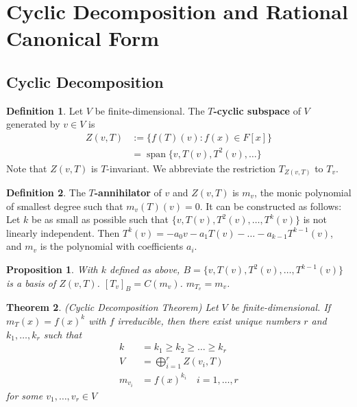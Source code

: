 \documentclass[12pt]{article}
\newtheorem{thm}{Theorem}[section]
\newtheorem{prop}[thm]{Proposition}
\theoremstyle{definition}
\newtheorem*{defn*}{Definition}
\DeclareMathOperator{\spn}{span}
\begin{document}
%

\section{Cyclic Decomposition and Rational Canonical Form}

\subsection{Cyclic Decomposition}

\begin{defn*}
	Let $V$ be finite-dimensional.
	The \textbf{$T$-cyclic subspace} of $V$ generated by $v \in V$ is
	\begin{align*}
		Z(v, T) &:= \{f(T)(v) : f(x) \in F[x]\}\\ 
				&= \spn\{v, T(v), T^2(v), \ldots\}
	\end{align*}
	Note that $Z(v, T)$ is $T$-invariant.
	We abbreviate the restriction $T_{Z(v, T)}$ to $T_v$.
\end{defn*}

\begin{defn*}
	The \textbf{$T$-annihilator} of $v$ and $Z(v, T)$ is $m_v$, the monic polynomial of smallest degree such that $m_v(T)(v) = 0$.
	It can be constructed as follows:
	Let $k$ be as small as possible such that $\{v, T(v), T^2(v), \ldots, T^k(v)\}$ is not linearly independent.
	Then $T^k(v) = -a_0v - a_1T(v) - \ldots - a_{k - 1}T^{k - 1}(v)$, and $m_v$ is the polynomial with coefficients $a_i$.
\end{defn*}

\begin{prop}
	With $k$ defined as above, $B = \{v, T(v), T^2(v), \ldots, T^{k - 1}(v)\}$ is a basis of $Z(v, T)$. $[T_v]_B = C(m_v)$. $m_{T_v} = m_v$.
\end{prop}

\begin{thm}
	(Cyclic Decomposition Theorem)
	Let $V$ be finite-dimensional.
	If $m_T(x) = f(x)^k$ with $f$ irreducible, then there exist unique numbers $r$ and $k_1, \ldots, k_r$ such that
	\begin{align*}
		k &= k_1 \geq k_2 \geq \ldots \geq k_r\\
		V &= \bigoplus_{i = 1}^rZ(v_i, T)\\
		m_{v_i} &= f(x)^{k_i}\quad i = 1, \ldots, r
	\end{align*}
	for some $v_1, \ldots, v_r \in V$
\end{thm}
\end{document}
